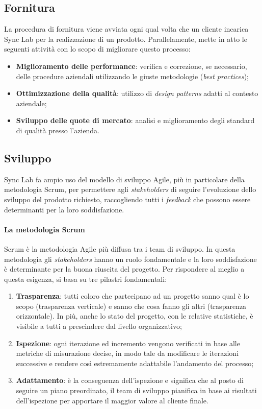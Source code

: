 \subsection{Fornitura}
La procedura di fornitura viene avviata ogni qual volta che un cliente incarica Sync Lab per la realizzazione di un prodotto. Parallelamente, mette in atto le seguenti attività con lo scopo di migliorare questo processo:
\begin{itemize}
  \item \textbf{Miglioramento delle performance}: verifica e correzione, se necessario, delle procedure aziendali utilizzando le giuste metodologie (\textit{best practices});
  \item \textbf{Ottimizzazione della qualità}: utilizzo di \textit{design patterns} adatti al contesto aziendale;
  \item \textbf{Sviluppo delle quote di mercato}: analisi e miglioramento degli standard di qualità presso l'azienda.
\end{itemize} 

\subsection{Sviluppo}
Sync Lab fa ampio uso del modello di sviluppo Agile, più in particolare della metodologia Scrum, per permettere agli \textit{stakeholders} di seguire l'evoluzione dello sviluppo del prodotto richiesto, raccogliendo tutti i \textit{feedback} che possono essere determinanti per la loro soddisfazione. 

\paragraph{La metodologia Scrum}
Scrum è la metodologia Agile più diffusa tra i team di sviluppo. In questa metodologia gli \textit{stakeholders} hanno un ruolo fondamentale e la loro soddisfazione è determinante per la buona riuscita del progetto. Per rispondere al meglio a questa esigenza, si basa su tre pilastri fondamentali:
\begin{enumerate}
  \item \textbf{Trasparenza}: tutti coloro che partecipano ad un progetto sanno qual è lo scopo (trasparenza verticale) e sanno che cosa fanno gli altri (trasparenza orizzontale). In più, anche lo stato del progetto, con le relative statistiche, è visibile a tutti a prescindere dal livello organizzativo;
  \item \textbf{Ispezione}: ogni iterazione ed incremento vengono verificati in base alle metriche di misurazione decise, in modo tale da modificare le iterazioni successive e rendere così estremamente adattabile l'andamento del processo;
  \item \textbf{Adattamento}: è la conseguenza dell'ispezione e significa che al posto di seguire un piano preordinato, il team di sviluppo pianifica in base ai risultati dell'ispezione per apportare il maggior valore al cliente finale.
\end{enumerate}

